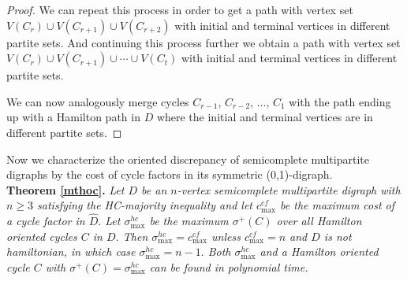 \documentclass{article}
\newcommand{\QG}[1]{{#1}}
\newcommand{\GGnn}[1]{{#1}}
\newcommand{\2}{\vspace{0.2cm}}
\begin{document}
\begin{proof}
We can repeat this process in order to get a path with vertex set $V(C_r) \cup V(C_{r+1}) \cup V(C_{r+2})$ with  initial and terminal vertices in different partite sets.
And continuing this process further we obtain a path with vertex set $V(C_r) \cup V(C_{r+1}) \cup \cdots \cup V(C_t)$ with  initial and terminal vertices in different partite sets.

We can now analogously merge cycles $C_{r-1}$, $C_{r-2}$, $\ldots$, $C_1$ with the path ending up with a Hamilton path in $D$ where the initial and terminal vertices are in different partite sets.
\end{proof}
Now we characterize the oriented discrepancy of semicomplete multipartite digraphs by the cost of cycle factors in its symmetric (0,1)-digraph.\\

\noindent\textbf{Theorem \ref{mthoc}.}
\textit{Let $D$ be an $n$-vertex semicomplete multipartite digraph  \GGnn{with $n\ge 3$} satisfying the HC-majority inequality and \QG{let $c^{cf}_{\max}$ be the maximum cost of a cycle factor in $\hat{D}.$ }Let $\sigma^{hc}_{\max}$ be the \GGnn{maximum $\sigma^+(C)$ over all Hamilton oriented cycles $C$} in $D$.
Then $\sigma^{hc}_{\max}=c^{cf}_{\max}$ unless $c^{cf}_{\max}=n$ and $D$ is not hamiltonian, in which case $\sigma^{hc}_{\max}=n-1.$
Both $\sigma^{hc}_{\max}$ and a Hamilton oriented cycle $C$ with  \GGnn{$\sigma^+(C)=\sigma^{hc}_{\max}$} can be found in polynomial time.}
\end{document}
